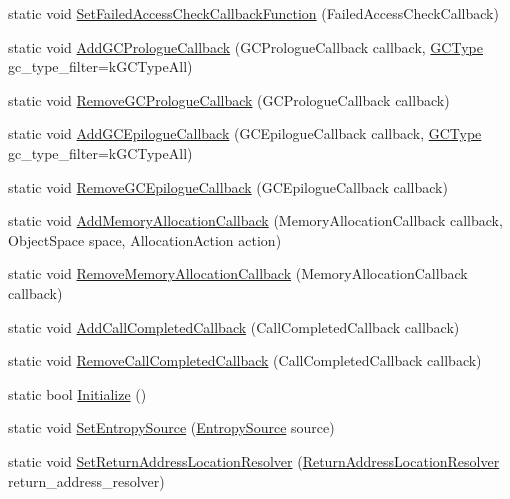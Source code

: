 \begin{DoxyCompactItemize}
\item 
static void \hyperlink{classv8_1_1_v8_aa6ed646d43360c209881871b3ac747aa}{Set\+Failed\+Access\+Check\+Callback\+Function} (Failed\+Access\+Check\+Callback)
\item 
static void \hyperlink{classv8_1_1_v8_a49c016f17c67f700387f801b2b29b5ab}{Add\+G\+C\+Prologue\+Callback} (G\+C\+Prologue\+Callback callback, \hyperlink{namespacev8_ac109d6f27e0c0f9ef4e98bcf7a806cf2}{G\+C\+Type} gc\+\_\+type\+\_\+filter=k\+G\+C\+Type\+All)
\item 
static void \hyperlink{classv8_1_1_v8_a7cdceb9c8ea5cd0887f69fd3bd97193f}{Remove\+G\+C\+Prologue\+Callback} (G\+C\+Prologue\+Callback callback)
\item 
static void \hyperlink{classv8_1_1_v8_a37aadf3536c772eb5bbf67fa7822679a}{Add\+G\+C\+Epilogue\+Callback} (G\+C\+Epilogue\+Callback callback, \hyperlink{namespacev8_ac109d6f27e0c0f9ef4e98bcf7a806cf2}{G\+C\+Type} gc\+\_\+type\+\_\+filter=k\+G\+C\+Type\+All)
\item 
static void \hyperlink{classv8_1_1_v8_a3382e4dae9865909242a8ee0b1d6bf77}{Remove\+G\+C\+Epilogue\+Callback} (G\+C\+Epilogue\+Callback callback)
\item 
static void \hyperlink{classv8_1_1_v8_ac9718f8dc3f3c498bf07282eb7c1618e}{Add\+Memory\+Allocation\+Callback} (Memory\+Allocation\+Callback callback, Object\+Space space, Allocation\+Action action)
\item 
static void \hyperlink{classv8_1_1_v8_a1e181f5bf42174b60cd5f4e3a0c20ce8}{Remove\+Memory\+Allocation\+Callback} (Memory\+Allocation\+Callback callback)
\item 
static void \hyperlink{classv8_1_1_v8_a3f70d920e58ac54b56f06363b5130fa3}{Add\+Call\+Completed\+Callback} (Call\+Completed\+Callback callback)
\item 
static void \hyperlink{classv8_1_1_v8_a551e1103c0d60a6dda8692a8b9b2db02}{Remove\+Call\+Completed\+Callback} (Call\+Completed\+Callback callback)
\item 
static bool \hyperlink{classv8_1_1_v8_a40daec93ce44bdd922567fc121be9db8}{Initialize} ()
\item 
static void \hyperlink{classv8_1_1_v8_a5331ce9c858af264f30de667c74c5a76}{Set\+Entropy\+Source} (\hyperlink{namespacev8_ab699f4bbbb56350e6e915682e420fcdc}{Entropy\+Source} source)
\item 
static void \hyperlink{classv8_1_1_v8_a7a9e8a96dcb3c3d306c0061b0a8e39c8}{Set\+Return\+Address\+Location\+Resolver} (\hyperlink{namespacev8_a8ce54c75241be41ff6a25e9944eefd2a}{Return\+Address\+Location\+Resolver} return\+\_\+address\+\_\+resolver)

\end{DoxyCompactItemize}
